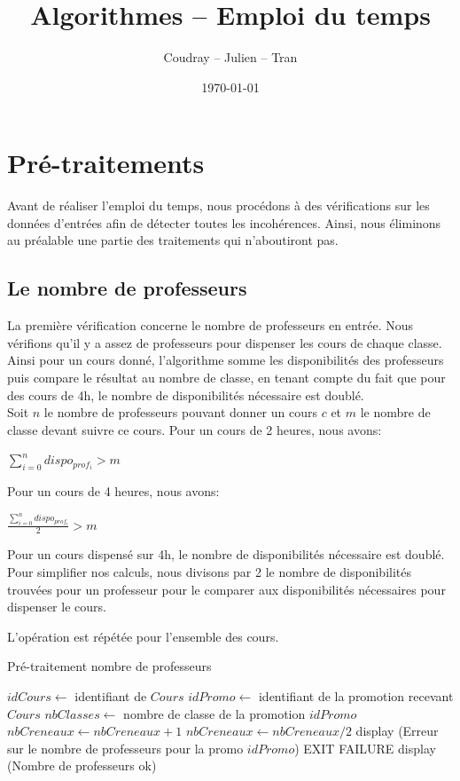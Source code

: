 \documentclass[12pt,a4paper,french]{article}
\begin{document}
\title{Algorithmes -- Emploi du temps}
\author{Coudray -- Julien -- Tran}
\date{\today}
\maketitle

\section{Pré-traitements}
Avant de réaliser l'emploi du temps, nous procédons à des vérifications sur les données d'entrées afin de détecter toutes les incohérences. Ainsi, nous éliminons au préalable une partie des traitements qui n'aboutiront pas.

\subsection{Le nombre de professeurs}
La première vérification concerne le nombre de professeurs en entrée. Nous vérifions qu'il y a assez de professeurs pour dispenser les cours de chaque classe.
Ainsi pour un cours donné, l'algorithme somme les disponibilités des professeurs puis compare le résultat au nombre de classe, en tenant compte du fait que pour des cours de 4h, le nombre de disponibilités nécessaire est doublé.\\

Soit $n$ le nombre de professeurs pouvant donner un cours $c$ et $m$ le nombre de classe devant suivre ce cours.
Pour un cours de 2 heures, nous avons:
\begin{center}
$\sum_{i=0}^n dispo_{prof_i} > m$
\end{center}

Pour un cours de 4 heures, nous avons: 
\begin{center}
$\frac{\sum_{i=0}^n dispo_{prof_i}}{2} > m$
\end{center}

Pour un cours dispensé sur 4h, le nombre de disponibilités nécessaire est doublé. Pour simplifier nos calculs, nous divisons par 2 le nombre de disponibilités trouvées pour un professeur pour le comparer aux disponibilités nécessaires pour dispenser le cours.

L'opération est répétée pour l'ensemble des cours. 

\begin{algorithm}
\caption{Pré-traitement nombre de professeurs}
\begin{algorithmic}
\STATE $idCours \leftarrow$ identifiant de $Cours$
\STATE $idPromo \leftarrow$ identifiant de la promotion recevant $Cours$
\STATE $nbClasses \leftarrow$ nombre de classe de la promotion $idPromo$
\STATE $nbCreneaux \leftarrow nbCreneaux + 1$
\ENDIF
\ENDFOR
\ENDIF
\ENDFOR
{}
\STATE $nbCreneaux \leftarrow nbCreneaux / 2$
\ENDIF
{}
\STATE display (Erreur sur le nombre de professeurs pour la promo $idPromo$)
\STATE EXIT FAILURE
\ENDIF
\ENDFOR
\STATE display (Nombre de professeurs ok)
\end{algorithmic}
\end{algorithm}
\end{document}
